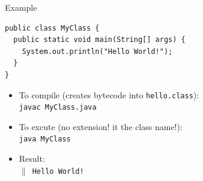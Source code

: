\documentclass[English,c,%
hyperref={%
    pdftitle={FISA-DE2 OOP in Java},%
    pdfauthor={Muller, Gravier, Laforest, Subercaze},%
    pdfsubject={OOP in Java},%
    pdfkeywords={OOP, Java},%
    colorlinks=true,%
    urlcolor=blue,%
    linkcolor=%
    },%
xcolor={pdftex,svgnames} %
]{beamer}
\begin{document}





\begin{frame}[fragile]{Example}
\begin{lstlisting}[escapechar=\%,label=hellojava,caption=MyClass.java]
public class MyClass {
  public static void main(String[] args) {
    System.out.println("Hello World!");
  }
}
\end{lstlisting}

\bigskip

\begin{itemize}
    \item To compile (creates bytecode into \texttt{hello.class}): \\
    \texttt{javac MyClass.java}
    \item To excute (no extension! it the class name!): \\
    \texttt{java MyClass}
    \item Result: \\
    \texttt{$\|$ Hello World!}
\end{itemize}

\end{frame}
\end{document}
